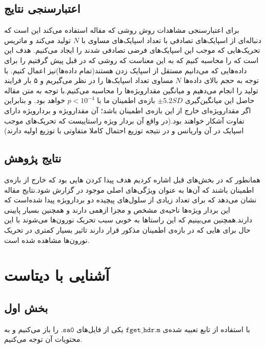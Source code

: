 \documentclass[12pt,onecolumn,a4paper,fleqn]{article}
\newcommand{\pf}[1]{$\mathtt{#1}$}
\begin{document}
\subsection{اعتبارسنجی نتایج}
برای اعتبارسنجی مشاهدات روش  روشی که مقاله‌ استفاده می‌کند این است که دنباله‌ای از اسپایک‌های تصادفی با تعداد اسپایک‌های مساوی با $N$ تولید می‌کند و ماتریس  تحریک‌هایی که موجب این اسپایک‌های فرضی تصادفی شدند را ایجاد می‌کنیم. هدف این است که  را محاسبه کنیم که به این معناست که روشی که در قبل پیش گرفتیم را برای داده‌هایی که می‌دانیم مستقل از اسپایک زدن هستند(تمام داده‌ها)نیز اعمال کنیم. با توجه به حجم بالای داده‌ها $N$ مساوی تعداد اسپایک‌ها را در نظر می‌گیریم و ۵ بار فرایند تولید  را انجام می‌دهیم و میانگین مقدارویژه‌ها را محاسبه می‌کنیم.با توجه به متن مقاله حاصل این میانگین‌گیری 
$\pm 5.2 SD$ 
بازه‌ی اطمینان ما با $p< 10^{-4}$ خواهد بود. و بنابراین اگر مقدارویژه‌ای خارج از این بازه‌ی اطمینان باشد؛ آن مقدارویژه و بردارویژه دارای تفاوت آشکار خواهند بود.(در واقع آن بردار ویژه راستاییست که تحریک‌های موجب اسپایک در آن واریانس و در نتیجه‌ توزیع احتمال کاملا متفاوتی با توزیع اولیه دارند)
\subsection{نتایج پژوهش}
همانطور که در بخش‌های قبل اشاره کردیم هدف پیدا کردن هایی بود که خارج از بازه‌ی اطمینان باشند که آن‌ها به عنوان ویژگی‌های اصلی موجود در  گزارش شود.نتایج مقاله نشان می‌دهد که برای تعداد زیادی از سلول‌های پیچیده دو بردارویژه پیدا شده‌است که این بردار ویژه‌ها ناحیه‌ی   مشخص و مجزا ازهمی دارند و همچنین  بسیار پایینی دارند.همچنین می‌بینیم که این راستا‌ها به خوبی سبب تحریک نورون‌ها می‌شوند با این حال برای هایی که در بازه‌ی اطمینان مذکور قرار دارند تاثیر بسیار کمتری در تحریک نورون‌ها مشاهده شده است.

\pagebreak

\section{آشنایی با دیتاست}

\subsection{بخش اول}
با استفاده از تابع تعبیه شده‌ی
	\pf{fget\_hdr.m}
 یکی از فایل‌های \pf{.sa0} را باز می‌کنیم و به محتویات آن توجه می‌کنیم.
 
\end{document}
